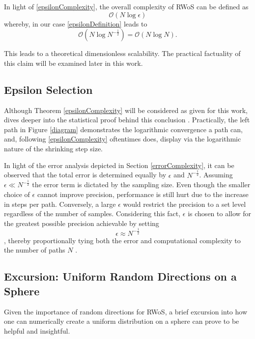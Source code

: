 In light of \ref{epsilonComplexity}, the overall complexity of \Gls{RWoS} can be
defined as $$\mathcal{O}(N \log{}\epsilon)$$ whereby, in our case \ref{epsilonDefinition}
 leads to $$\mathcal{O}(N \log{N^{-\frac{1}{2}}}) = \mathcal{O}(N \log{N}).$$

 This leads to a theoretical dimensionless scalability\cite{Bornemann}.  The practical factuality
 of this claim will be examined later in this work.  %

\subsection{Epsilon Selection}

Although Theorem \ref{epsilonComplexity} will be considered as given for this work,
dives deeper into the statistical proof behind this conclusion \cite{DeLaurentis}.  Practically, the
 left path in Figure \ref{diagram} demonstrates the logarithmic convergence a path
 can, and, following \ref{epsilonComplexity} oftentimes does, display via the logarithmic
 nature of the shrinking step size.

 In light of the error analysis depicted in Section \ref{errorComplexity}, it can be observed that the total error is
 determined equally by $\epsilon$ and $N^{-\frac{1}{2}}$. Assuming $ \epsilon \ll N^{-\frac{1}{2}} $ the error term
 is dictated by the sampling size.  Even though the
 smaller choice of $\epsilon$ cannot improve precision, performance is still hurt
 due to the increase in steps per path. Conversely, a large $\epsilon$ would
 restrict the precision to a set level regardless of the number of samples.
 Considering this fact, $\epsilon$ is chosen to allow for
 the greatest possible precision achievable by setting
  $$\epsilon \approx N^{-\frac{1}{2}}$$\label{epsilonDefinition},
 thereby proportionally tying both the error and computational complexity to the
 number of paths $N$ \cite{Bornemann}.
\subsection{Excursion: Uniform Random Directions on a Sphere}\label{uniformPoints}
Given the importance of random directions for \Gls{RWoS}, a brief excursion
into how one can numerically create a uniform distribution on a sphere can prove
to be helpful and insightful.

